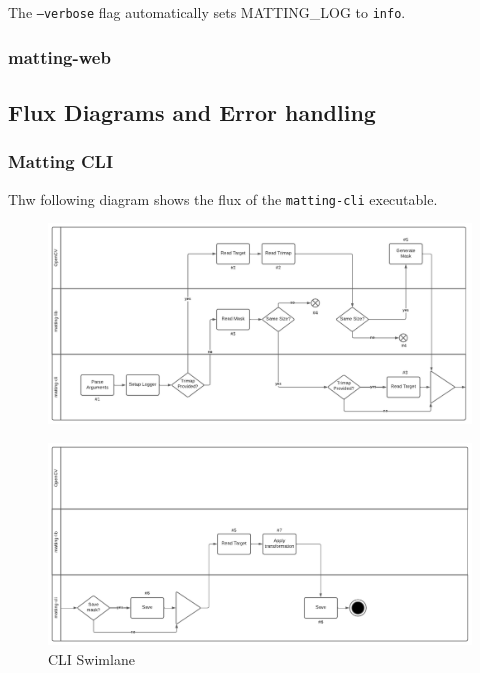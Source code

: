 \documentclass[a4paper]{article}
\begin{document}
The \texttt{--verbose} flag automatically sets \colorbox{gray!10}{MATTING\_LOG}
to \colorbox{gray!10}{\texttt{info}}. \\

\subsubsection{matting-web}

\pagebreak

\subsection{Flux Diagrams and Error handling}

\subsubsection{Matting CLI}

Thw following diagram shows the flux of the \texttt{matting-cli} executable.

\begin{figure}[h]
    \includegraphics[width=\textwidth]{media/swimlane1.pdf}
\end{figure}

\begin{figure}[h]
    \includegraphics[width=\textwidth]{media/swimlane2.pdf}
    \caption{CLI Swimlane}
\end{figure}
\end{document}
